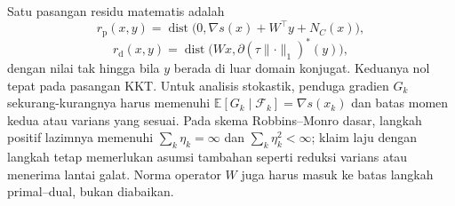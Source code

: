 Satu pasangan residu matematis adalah
\[
 r_{\mathrm p}(x,y)=
 \operatorname{dist}\bigl(0,\nabla s(x)+W^\top y+N_C(x)\bigr),
\]
\[
 r_{\mathrm d}(x,y)=
 \operatorname{dist}\bigl(Wx,\partial(\tau\lVert\cdot\rVert_1)^*(y)\bigr),
\]
dengan nilai tak hingga bila $y$ berada di luar domain konjugat. Keduanya nol
tepat pada pasangan KKT\@. Untuk analisis stokastik, penduga gradien
$G_k$ sekurang-kurangnya harus memenuhi
$\mathbb E[G_k\mid\mathcal F_k]=\nabla s(x_k)$ dan batas momen kedua atau
varians yang sesuai. Pada skema Robbins--Monro dasar, langkah positif lazimnya
memenuhi $\sum_k\eta_k=\infty$ dan $\sum_k\eta_k^2<\infty$; klaim laju dengan
langkah tetap memerlukan asumsi tambahan seperti reduksi varians atau menerima
lantai galat. Norma operator $W$ juga harus masuk ke batas langkah
primal--dual, bukan diabaikan.
